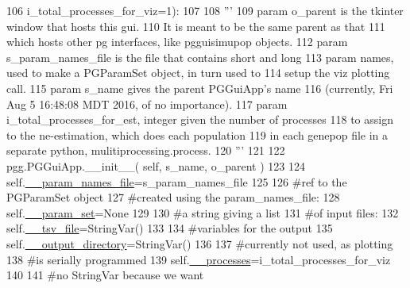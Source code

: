 \begin{DoxyCode}
106                         i\_total\_processes\_for\_viz=1):
107 
108         \textcolor{stringliteral}{'''}
109 \textcolor{stringliteral}{        param o\_parent is the tkinter window that hosts this gui.  }
110 \textcolor{stringliteral}{            It is meant to be the same parent as that }
111 \textcolor{stringliteral}{            which hosts other pg interfaces, like pgguisimupop objects.}
112 \textcolor{stringliteral}{        param s\_param\_names\_file is the file that contains short and long }
113 \textcolor{stringliteral}{            param names, used to make a PGParamSet object, in turn used to }
114 \textcolor{stringliteral}{            setup the viz plotting call.}
115 \textcolor{stringliteral}{        param s\_name gives the parent PGGuiApp's name }
116 \textcolor{stringliteral}{            (currently, Fri Aug  5 16:48:08 MDT 2016, of no importance).}
117 \textcolor{stringliteral}{        param i\_total\_processes\_for\_est, integer given the number of processes }
118 \textcolor{stringliteral}{            to assign to the ne-estimation, which does each population }
119 \textcolor{stringliteral}{            in each genepop file in a separate python, mulitiprocessing.process.}
120 \textcolor{stringliteral}{        '''}
121                 
122         pgg.PGGuiApp.\_\_init\_\_( self, s\_name, o\_parent )
123 
124         self.\hyperlink{classnegui_1_1pgguiviz_1_1PGGuiViz_a42b1b9de230018b721ecd9ca735dc0c7}{\_\_param\_names\_file}=s\_param\_names\_file
125 
126         \textcolor{comment}{#ref to the PGParamSet object}
127         \textcolor{comment}{#created using the param\_names\_file:}
128         self.\hyperlink{classnegui_1_1pgguiviz_1_1PGGuiViz_a8af7c9e5038a25f8a3ef0ccb9a9392f9}{\_\_param\_set}=\textcolor{keywordtype}{None}
129         
130         \textcolor{comment}{#a string giving a list }
131         \textcolor{comment}{#of input files:}
132         self.\hyperlink{classnegui_1_1pgguiviz_1_1PGGuiViz_a3150291d228ac7e88886456738d69a8a}{\_\_tsv\_file}=StringVar()
133 
134         \textcolor{comment}{#variables for the output}
135         self.\hyperlink{classnegui_1_1pgguiviz_1_1PGGuiViz_afc670cfef85fd8e17b6ac4a9fca66834}{\_\_output\_directory}=StringVar()
136 
137         \textcolor{comment}{#currently not used, as plotting}
138         \textcolor{comment}{#is serially programmed}
139         self.\hyperlink{classnegui_1_1pgguiviz_1_1PGGuiViz_aa00295d5e7e00041ac09da51c4526a5c}{\_\_processes}=i\_total\_processes\_for\_viz
140 
141         \textcolor{comment}{#no StringVar because we want}

\end{DoxyCode}
